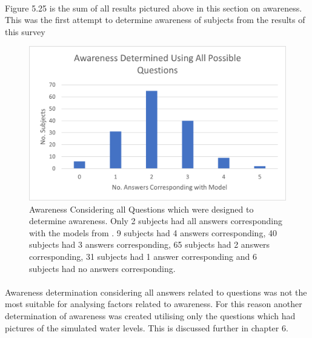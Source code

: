 \paragraph{}



Figure 5.25 is the sum of all results pictured above in this section on awareness. This was the first attempt to determine awareness of subjects from the results of this survey

\begin{figure}[H]
    \centering
    \includegraphics{fig_results/aware_all.png}
    \caption{Awareness Considering all Questions which were designed to determine awareness. Only 2 subjects had all answers corresponding with the models from \cite{kartverket_se_2020}. 9 subjects had 4 answers corresponding, 40 subjects had 3 answers corresponding, 65 subjects had 2 answers corresponding, 31 subjects had 1 answer corresponding and 6 subjects had no answers corresponding. }
    \label{fig:aware-all}
\end{figure}
\paragraph{}

 Awareness determination considering all answers related to questions was not the most suitable for analysing factors related to awareness. For this reason another determination of awareness was created utilising only the questions which had pictures of the simulated water levels. This is discussed further in chapter 6. 
\paragraph{}

